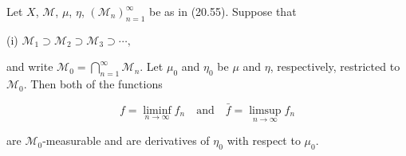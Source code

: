 Let $X$, $\mathcal{M}$, $\mu$, $\eta$, $(\mathcal{M}_n)_{n=1}^{\infty}$ be as in (20.55). Suppose that

(i) $\mathcal{M}_1 \supset \mathcal{M}_2 \supset \mathcal{M}_3 \supset \cdots,$

and write $\mathcal{M}_0 = \bigcap_{n=1}^{\infty} \mathcal{M}_n$. Let $\mu_0$ and $\eta_0$ be $\mu$ and $\eta$, respectively, restricted to $\mathcal{M}_0$. Then both of the functions

$$f = \liminf_{n \to \infty} f_n \quad \text{and} \quad \bar{f} = \limsup_{n \to \infty} f_n$$

are $\mathcal{M}_0$-measurable and are derivatives of $\eta_0$ with respect to $\mu_0$.
